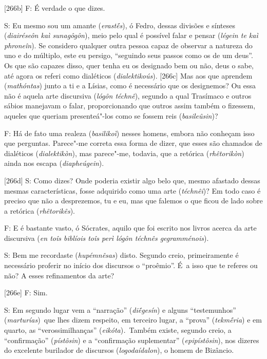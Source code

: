  

[266b] F: É verdade o que dizes.

 

S: Eu mesmo sou um amante (\emph{erastḗs}), ó Fedro, dessas divisões e
sínteses (\emph{diairéseôn kaì sunagôgôn}), meio pelo qual é possível
falar e pensar (\emph{légein te kaì phroneîn}). Se considero qualquer
outra pessoa capaz de observar a natureza do uno e do múltiplo, este eu
persigo, ``seguindo seus passos como os de um deus''. Os que são capazes
disso, quer tenha eu os designado bem ou não, deus o sabe, até agora os
referi como dialéticos (\emph{dialektikoús}). [266c] Mas aos que
aprendem (\emph{mathóntas}) junto a ti e a Lísias, como é necessário que
os designemos? Ou essa não é aquela arte discursiva (\emph{lógôn
téchnê}), segundo a qual Trasímaco e outros sábios manejavam o falar,
proporcionando que outros assim também o fizessem, aqueles que queriam
presenteá"-los como se fossem reis (\emph{basileûsin})?

 

F: Há de fato uma realeza (\emph{basilikoì}) nesses homens, embora não
conheçam isso que perguntas. Parece"-me correta essa forma de dizer, que
esses são chamados de dialéticos (\emph{dialektikòn}), mas parece"-me,
todavia, que a retórica (\emph{rhêtorikòn}) ainda nos escapa
(\emph{diapheúgein}).

 

[266d] S: Como dizes? Onde poderia existir algo belo que, mesmo
afastado dessas mesmas características, fosse adquirido como uma arte
(\emph{téchnêi})? Em todo caso é preciso que não a desprezemos, tu e eu,
mas que falemos o que ficou de lado sobre a retórica
(\emph{rhêtorikês}).

 

F: E é bastante vasto, ó Sócrates, aquilo que foi escrito nos livros
acerca da arte discursiva (\emph{en toîs biblíois toîs perì lógôn
téchnês gegramménois}).

 

S: Bem me recordaste (\emph{hupémnêsas}) disto. Segundo creio,
primeiramente é necessário proferir no início dos discursos o
``proêmio''. É~a isso que te referes ou não? A esses refinamentos da
arte?

 

[266e] F: Sim.

 

S: Em segundo lugar vem a ``narração'' (\emph{diḗgesín}) e alguns
``testemunhos'' (\emph{marturías})\emph{~}que lhes dizem respeito, em
terceiro lugar, a ``prova'' (\emph{tekmḗria}) e em quarto, as
``verossimilhanças'' (\emph{eikóta})\emph{.~}Também existe, segundo
creio, a ``confirmação'' (\emph{pístôsin}) e a ``confirmação
suplementar'' (\emph{epipístôsin}), nos dizeres do excelente burilador
de discursos (\emph{logodaídalon}), o homem de Bizâncio.

